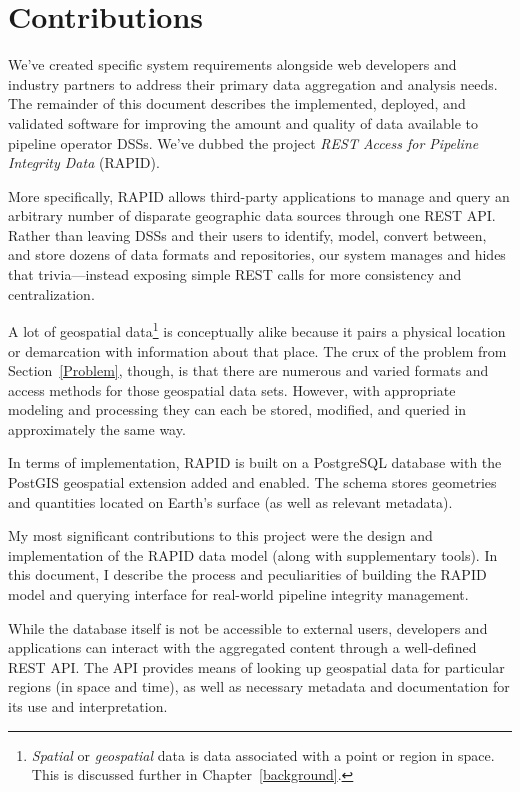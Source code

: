 \section{Contributions}
We've created specific system requirements alongside web developers and industry partners to address their primary data aggregation and analysis needs. The remainder of this document describes the implemented, deployed, and validated software for improving the amount and quality of data available to pipeline operator DSSs. We've dubbed the project \textit{REST Access for Pipeline Integrity Data} (RAPID).

More specifically, RAPID allows third-party applications to manage and query an arbitrary number of disparate geographic data sources through one REST API. Rather than leaving DSSs and their users to identify, model, convert between, and store dozens of data formats and repositories, our system manages and hides that trivia---instead exposing simple REST calls for more consistency and centralization.

A lot of geospatial data\footnote{\textit{Spatial} or \textit{geospatial} data is data associated with a point or region in space. This is discussed further in Chapter~\ref{background}.} is conceptually alike because it pairs a physical location or demarcation with information about that place. The crux of the problem from Section~\ref{Problem}, though, is that there are numerous and varied formats and access methods for those geospatial data sets. However, with appropriate modeling and processing they can each be stored, modified, and queried in approximately the same way.

In terms of implementation, RAPID is built on a PostgreSQL database with the PostGIS geospatial extension added and enabled. The schema stores geometries and quantities located on Earth's surface (as well as relevant metadata).

My most significant contributions to this project were the design and implementation of the RAPID data model (along with supplementary tools). In this document, I describe the process and peculiarities of building the RAPID model and querying interface for real-world pipeline integrity management.

While the database itself is not be accessible to external users, developers and applications can interact with the aggregated content through a well-defined REST API. The API provides means of looking up geospatial data for particular regions (in space and time), as well as necessary metadata and documentation for its use and interpretation.

